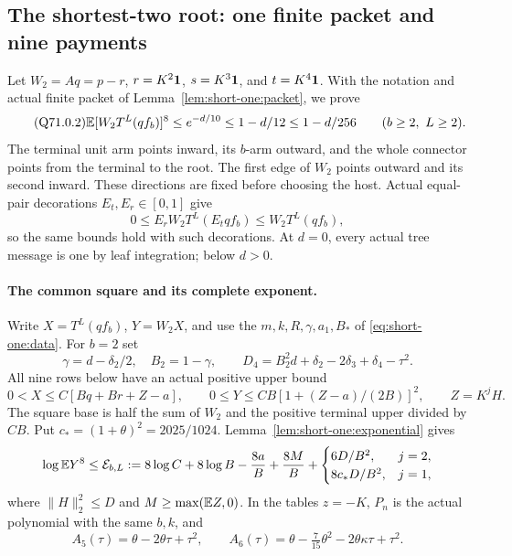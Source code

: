 \subsection{The shortest-two root: one finite packet and nine payments}
\label{proof:Q5-C071}
Let \(W_2=Aq=p-r\), \(r=K^2\mathbf1\), \(s=K^3\mathbf1\), and
\(t=K^4\mathbf1\). With the notation and actual finite packet of
Lemma~\ref{lem:short-one:packet}, we prove
\begin{equation}\tag{Q71.0.2}\label{eq:short2:claim}
 \mathbb E[W_2T^L(qf_b)]^8\le e^{-d/10}\le1-d/12\le1-d/256
 \qquad(b\ge2,\ L\ge2).
\end{equation}
The terminal unit arm points inward, its \(b\)-arm outward, and the
whole connector points from the terminal to the root. The first edge
of \(W_2\) points outward and its second inward.
These directions are fixed before choosing the host.
Actual equal-pair decorations \(E_t,E_r\in[0,1]\) give
\[
 0\le E_rW_2T^L(E_tqf_b)\le W_2T^L(qf_b),
\]
so the same bounds hold with such decorations. At \(d=0\), every
actual tree message is one by leaf integration; below \(d>0\).

\paragraph{The common square and its complete exponent.}\label{part:Q71.2}
Write \(X=T^L(qf_b)\), \(Y=W_2X\), and use the \(m,k,R,\gamma,a_1,B_*\)
of \eqref{eq:short-one:data}. For \(b=2\) set
\[
 \gamma=d-\delta_2/2,\quad B_2=1-\gamma,\qquad
 D_4=B_2^2d+\delta_2-2\delta_3+\delta_4-\tau^2.
\]
All nine rows below have an actual positive upper bound
\begin{equation}\label{eq:short2:common-square}
 0<X\le C[Bq+Br+Z-a],\qquad
 0\le Y\le CB[1+(Z-a)/(2B)]^2,\qquad Z=K^jH.
\end{equation}
The square base is half the sum of \(W_2\) and the positive terminal
upper divided by \(CB\).
Put \(c_*=(1+\theta)^2=2025/1024\).
Lemma~\ref{lem:short-one:exponential} gives
\begin{equation}\label{eq:short2:complete-exponent}
 \log\mathbb E Y^8\le\mathcal E_{b,L}:=
 8\log C+8\log B-\frac{8a}{B}+\frac{8M}{B}
 +\begin{cases}6D/B^2,&j=2,\\8c_*D/B^2,&j=1,\end{cases}
\end{equation}
where \(\|H\|_2^2\le D\) and \(M\ge\max(\mathbb E Z,0)\).
In the tables \(z=-K\), \(P_n\) is the actual polynomial with the
same \(b,k\), and
\[
 A_5(\tau)=\theta-2\theta\tau+\tau^2,\qquad
 A_6(\tau)=\theta-\tfrac7{15}\theta^2-2\theta\kappa\tau+\tau^2.
\]

